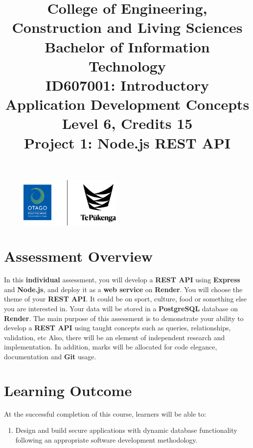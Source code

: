 \documentclass{article}
\author{}
\begin{document}
\begin{figure}
	\centering
	\includegraphics[width=50mm]{../img/logo.png}
\end{figure}

\title{College of Engineering, Construction and Living Sciences\\Bachelor of Information Technology\\ID607001: Introductory Application Development Concepts\\Level 6, Credits 15\\\textbf{Project 1: Node.js REST API}}
\date{}
\maketitle

\section*{Assessment Overview}
In this \textbf{individual} assessment, you will develop a \textbf{REST API} using \textbf{Express} and \textbf{Node.js}, and deploy it as a \textbf{web service} on \textbf{Render}. You will choose the theme of your \textbf{REST API}. It could be on sport, culture, food or something else you are interested in. Your data will be stored in a \textbf{PostgreSQL} database on \textbf{Render}. The main purpose of this assessment is to demonstrate your ability to develop a \textbf{REST API} using taught concepts such as queries, relationships, validation, etc Also, there will be an element of independent research and implementation. In addition, marks will be allocated for code elegance, documentation and \textbf{Git} usage.

\section*{Learning Outcome}
At the successful completion of this course, learners will be able to:
\begin{enumerate}
	\item Design and build secure applications with dynamic database functionality following an appropriate software development methodology.
\end{enumerate}
\end{document}
